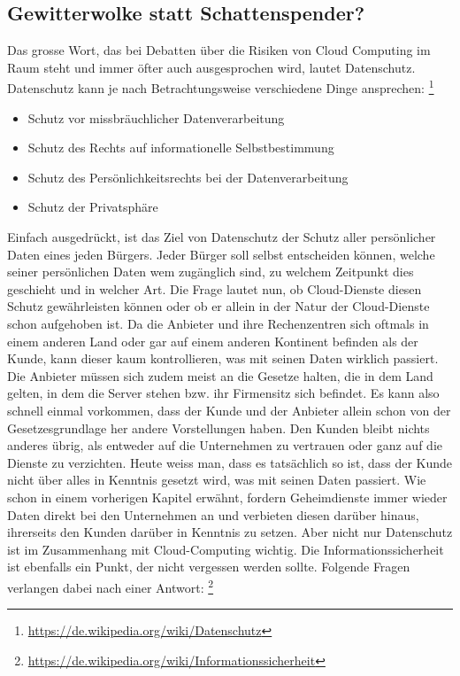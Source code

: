 \subsection{Gewitterwolke statt Schattenspender?}
Das grosse Wort, das bei Debatten über die Risiken von Cloud Computing im Raum steht und immer öfter auch ausgesprochen wird, lautet Datenschutz. Datenschutz kann je nach Betrachtungsweise verschiedene Dinge ansprechen:
\footnote{\url{https://de.wikipedia.org/wiki/Datenschutz}}

\begin{itemize}
\item Schutz vor missbräuchlicher Datenverarbeitung
\item Schutz des Rechts auf informationelle Selbstbestimmung
\item Schutz des Persönlichkeitsrechts bei der Datenverarbeitung
\item Schutz der Privatsphäre
\end{itemize}

Einfach ausgedrückt, ist das Ziel von Datenschutz der Schutz aller persönlicher Daten eines jeden Bürgers. Jeder Bürger soll selbst entscheiden können, welche seiner persönlichen Daten wem zugänglich sind, zu welchem Zeitpunkt dies geschieht und in welcher Art. Die Frage lautet nun, ob Cloud-Dienste diesen Schutz gewährleisten können oder ob er allein in der Natur der Cloud-Dienste schon aufgehoben ist. Da die Anbieter und ihre Rechenzentren sich oftmals in einem anderen Land oder gar auf einem anderen Kontinent befinden als der Kunde, kann dieser kaum kontrollieren, was mit seinen Daten wirklich passiert. Die Anbieter müssen sich zudem meist an die Gesetze halten, die in dem Land gelten, in dem die Server stehen bzw. ihr Firmensitz sich befindet. Es kann also schnell einmal vorkommen, dass der Kunde und der Anbieter allein schon von der Gesetzesgrundlage her andere Vorstellungen haben. Den Kunden bleibt nichts anderes übrig, als entweder auf die Unternehmen zu vertrauen oder ganz auf die Dienste zu verzichten. Heute weiss man, dass es tatsächlich so ist, dass der Kunde nicht über alles in Kenntnis gesetzt wird, was mit seinen Daten passiert. Wie schon in einem vorherigen Kapitel erwähnt, fordern Geheimdienste immer wieder Daten direkt bei den Unternehmen an und verbieten diesen darüber hinaus, ihrerseits den Kunden darüber in Kenntnis zu setzen. 
Aber nicht nur Datenschutz ist im Zusammenhang mit Cloud-Computing wichtig. Die Informationssicherheit ist ebenfalls ein Punkt, der nicht vergessen werden sollte. Folgende Fragen verlangen dabei nach einer Antwort:
\footnote{\url{https://de.wikipedia.org/wiki/Informationssicherheit}}

